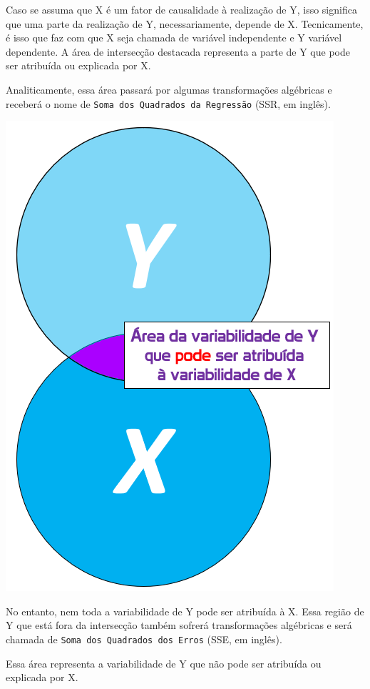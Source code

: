 \documentclass[
]{book}
\begin{document}
Caso se assuma que X é um fator de causalidade à realização de Y, isso significa que uma parte da realização de Y, necessariamente, depende de X. Tecnicamente, é isso que faz com que X seja chamada de variável independente e Y variável dependente. A área de intersecção destacada representa a parte de Y que pode ser atribuída ou explicada por X.

Analiticamente, essa área passará por algumas transformações algébricas e receberá o nome de \texttt{Soma\ dos\ Quadrados\ da\ Regressão} (SSR, em inglês).

\includegraphics{./img/cap_reg_xy_SSR.png}

No entanto, nem toda a variabilidade de Y pode ser atribuída à X. Essa região de Y que está fora da intersecção também sofrerá transformações algébricas e será chamada de \texttt{Soma\ dos\ Quadrados\ dos\ Erros} (SSE, em inglês).

Essa área representa a variabilidade de Y que não pode ser atribuída ou explicada por X.
\end{document}
